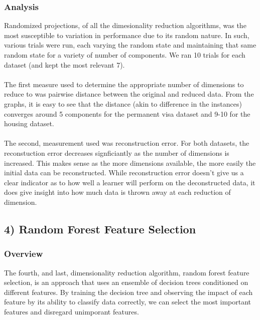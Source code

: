 \documentclass[h]{article}
\begin{document}
\subsubsection*{Analysis}
Randomized projections, of all the dimesionality reduction algorithms, was the 
most susceptible to variation in performance due to its random nature.  In such, 
various trials were run, each varying the random state and maintaining that same random state for a variety of 
number of components.  We ran 10 trials for each dataset (and kept the most relevant 7).  
\\ \\
The first measure used to determine the appropriate 
number of dimensions to reduce to was pairwise distance between the original and 
reduced data.  From the graphs, it is easy to see that the distance (akin to difference in the instances) 
converges around 5 components for the permanent visa dataset and 9-10 for the 
housing dataset.
\\ \\
The second, measurement used was reconstruction error.  For both datasets, the 
reconstuction error decreases signficiantly as the number of dimensions is 
increased.  This makes sense as the more dimensions available, the more easily 
the initial data can be reconstructed.  While reconstruction error doesn't give 
us a clear indicator as to how well a learner will perform on the deconstructed 
data, it does give insight into how much data is thrown away at each reduction 
of dimension.

\subsection*{4) Random Forest Feature Selection}  
\subsubsection*{Overview}
The fourth, and last, dimensionality reduction algorithm, random forest feature selection, is an 
approach that uses an ensemble of decision trees conditioned on different 
features.  By training the decision tree and observing the impact of each 
feature by its ability to classify data correctly, we can select the most 
important features and disregard unimporant features.
\end{document}
